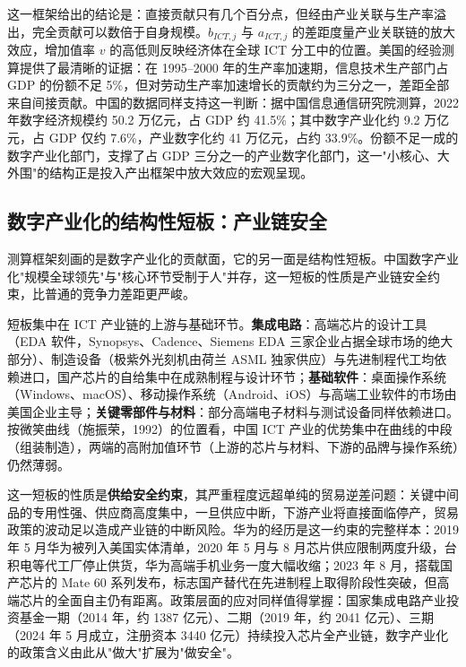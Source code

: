 这一框架给出的结论是：直接贡献只有几个百分点，但经由产业关联与生产率溢出，完全贡献可以数倍于自身规模。$b_{ICT,j}$ 与 $a_{ICT,j}$ 的差距度量产业关联链的放大效应，增加值率 $v$ 的高低则反映经济体在全球 ICT 分工中的位置。美国的经验测算提供了最清晰的证据：在 1995--2000 年的生产率加速期，信息技术生产部门占 GDP 的份额不足 5\%，但对劳动生产率加速增长的贡献约为三分之一，差距全部来自间接贡献。中国的数据同样支持这一判断：据中国信息通信研究院测算，2022 年数字经济规模约 50.2 万亿元，占 GDP 约 41.5\%；其中数字产业化约 9.2 万亿元，占 GDP 仅约 7.6\%，产业数字化约 41 万亿元，占约 33.9\%。份额不足一成的数字产业化部门，支撑了占 GDP 三分之一的产业数字化部门，这一"小核心、大外围"的结构正是投入产出框架中放大效应的宏观呈现。

\subsection{数字产业化的结构性短板：产业链安全}

测算框架刻画的是数字产业化的贡献面，它的另一面是结构性短板。中国数字产业化"规模全球领先"与"核心环节受制于人"并存，这一短板的性质是产业链安全约束，比普通的竞争力差距更严峻。

短板集中在 ICT 产业链的上游与基础环节。\textbf{集成电路}：高端芯片的设计工具（EDA 软件，Synopsys、Cadence、Siemens EDA 三家企业占据全球市场的绝大部分）、制造设备（极紫外光刻机由荷兰 ASML 独家供应）与先进制程代工均依赖进口，国产芯片的自给集中在成熟制程与设计环节；\textbf{基础软件}：桌面操作系统（Windows、macOS）、移动操作系统（Android、iOS）与高端工业软件的市场由美国企业主导；\textbf{关键零部件与材料}：部分高端电子材料与测试设备同样依赖进口。按微笑曲线（施振荣，1992）的位置看，中国 ICT 产业的优势集中在曲线的中段（组装制造），两端的高附加值环节（上游的芯片与材料、下游的品牌与操作系统）仍然薄弱。

这一短板的性质是\textbf{供给安全约束}，其严重程度远超单纯的贸易逆差问题：关键中间品的专用性强、供应商高度集中，一旦供应中断，下游产业将直接面临停产，贸易政策的波动足以造成产业链的中断风险。华为的经历是这一约束的完整样本：2019 年 5 月华为被列入美国实体清单，2020 年 5 月与 8 月芯片供应限制两度升级，台积电等代工厂停止供货，华为高端手机业务一度大幅收缩；2023 年 8 月，搭载国产芯片的 Mate 60 系列发布，标志国产替代在先进制程上取得阶段性突破，但高端芯片的全面自主仍有距离。政策层面的应对同样值得掌握：国家集成电路产业投资基金一期（2014 年，约 1387 亿元）、二期（2019 年，约 2041 亿元）、三期（2024 年 5 月成立，注册资本 3440 亿元）持续投入芯片全产业链，数字产业化的政策含义由此从"做大"扩展为"做安全"。

